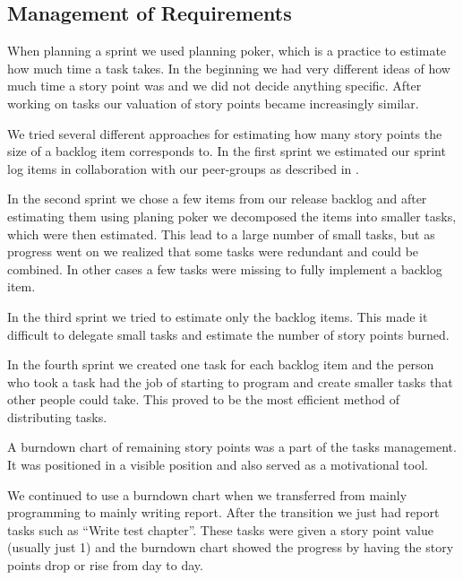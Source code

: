 \subsection{Management of Requirements}
When planning a sprint we used planning poker, which is a \scrum{} practice to estimate how much time a task takes. 
In the beginning we had very different ideas of how much time a story point was and we did not decide anything specific. 
After working on tasks our valuation of story points became increasingly similar.

We tried several different approaches for estimating how many story points the size of a backlog item corresponds to. 
In the first sprint we estimated our sprint log items in collaboration with our peer-groups as described in .

In the second sprint we chose a few items from our release backlog and after estimating them using planing poker we decomposed the items into smaller tasks, which were then estimated. 
This lead to a large number of small tasks, but as progress went on we realized that some tasks were redundant and could be combined. 
In other cases a few tasks were missing to fully implement a backlog item.

In the third sprint we tried to estimate only the backlog items.
This made it difficult to delegate small tasks and estimate the number of story points burned.

In the fourth sprint we created one task for each backlog item and the person who took a task had the job of starting to program and create smaller tasks that other people could take. 
This proved to be the most efficient method of distributing tasks.

A burndown chart of remaining story points was a part of the tasks management.
It was positioned in a visible position and also served as a motivational tool.

We continued to use a burndown chart when we transferred from mainly programming to mainly writing report.
After the transition we just had report tasks such as ``Write test chapter''.
These tasks were given a story point value (usually just 1) and the burndown chart showed the progress by having the story points drop or rise from day to day.

